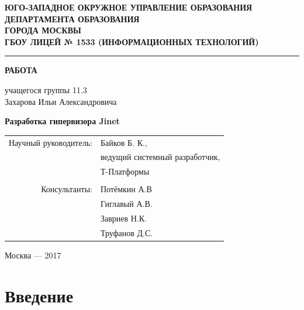 \documentclass[a4paper,11pt]{extarticle}
\begin{document}
	{
		\begin{titlepage}
			\centering
			\textbf{\uppercase{ЮГО-ЗАПАДНОЕ ОКРУЖНОЕ УПРАВЛЕНИЕ ОБРАЗОВАНИЯ\\ДЕПАРТАМЕНТА ОБРАЗОВАНИЯ\\ГОРОДА МОСКВЫ\\\vspace{0.5cm}ГБОУ Лицей № 1533 (информационных технологий)}}\par
			\rule{\textwidth}{1pt}\par
			\vspace{2.25cm}
			\large\textbf{РАБОТА}\par
			\vspace{0.5cm}
			\large{учащегося группы 11.3\\Захарова Ильи Александровича}\par
			\vspace{2cm}
			{\Huge{\textbf{Разработка гипервизора Jinet}}}\par
			\vspace{3cm}
			\begin{flushright}
				\begin{tabular}{rl}
					Научный руководитель:& Байков Б. К.,\\
					& ведущий системный разработчик,\\
					& \flqq Т-Платформы\frqq\\
					& \\
					Консультанты:& Потёмкин А.В\\
					& Гиглавый А.В.\\
					& Завриев Н.К.\\
					& Труфанов Д.С.
					
				\end{tabular}
			\end{flushright}
			\par
			\vfill
			Москва --- 2017
		\end{titlepage}
	}
	\linespread{1.4}
	\tableofcontents
	\linespread{1.3}
	\pagebreak
	\section{Введение}
	
\end{document}
